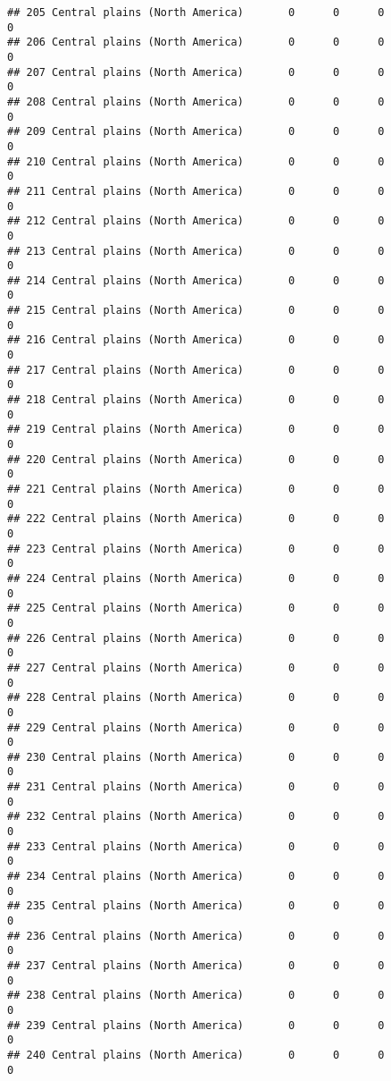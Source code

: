 \documentclass[]{article}
\begin{document}
\begin{verbatim}
## 205 Central plains (North America)       0      0      0             0
## 206 Central plains (North America)       0      0      0             0
## 207 Central plains (North America)       0      0      0             0
## 208 Central plains (North America)       0      0      0             0
## 209 Central plains (North America)       0      0      0             0
## 210 Central plains (North America)       0      0      0             0
## 211 Central plains (North America)       0      0      0             0
## 212 Central plains (North America)       0      0      0             0
## 213 Central plains (North America)       0      0      0             0
## 214 Central plains (North America)       0      0      0             0
## 215 Central plains (North America)       0      0      0             0
## 216 Central plains (North America)       0      0      0             0
## 217 Central plains (North America)       0      0      0             0
## 218 Central plains (North America)       0      0      0             0
## 219 Central plains (North America)       0      0      0             0
## 220 Central plains (North America)       0      0      0             0
## 221 Central plains (North America)       0      0      0             0
## 222 Central plains (North America)       0      0      0             0
## 223 Central plains (North America)       0      0      0             0
## 224 Central plains (North America)       0      0      0             0
## 225 Central plains (North America)       0      0      0             0
## 226 Central plains (North America)       0      0      0             0
## 227 Central plains (North America)       0      0      0             0
## 228 Central plains (North America)       0      0      0             0
## 229 Central plains (North America)       0      0      0             0
## 230 Central plains (North America)       0      0      0             0
## 231 Central plains (North America)       0      0      0             0
## 232 Central plains (North America)       0      0      0             0
## 233 Central plains (North America)       0      0      0             0
## 234 Central plains (North America)       0      0      0             0
## 235 Central plains (North America)       0      0      0             0
## 236 Central plains (North America)       0      0      0             0
## 237 Central plains (North America)       0      0      0             0
## 238 Central plains (North America)       0      0      0             0
## 239 Central plains (North America)       0      0      0             0
## 240 Central plains (North America)       0      0      0             0

\end{verbatim}
\end{document}
